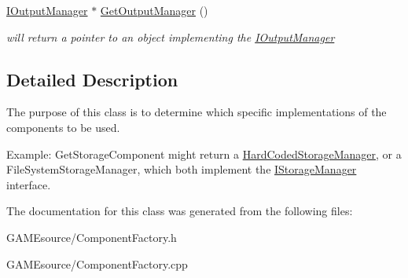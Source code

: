 \begin{DoxyCompactItemize}
\mbox{\label{class_component_factory_a19583d4fc53d5942e5c0558a52809086}} 
\mbox{\hyperlink{class_i_output_manager}{I\+Output\+Manager}} $\ast$ \mbox{\hyperlink{class_component_factory_a19583d4fc53d5942e5c0558a52809086}{Get\+Output\+Manager}} ()
\begin{DoxyCompactList}\small\item\em will return a pointer to an object implementing the \mbox{\hyperlink{class_i_output_manager}{I\+Output\+Manager}} \end{DoxyCompactList}\end{DoxyCompactItemize}


\subsection{Detailed Description}
The purpose of this class is to determine which specific implementations of the components to be used. 

Example\+: Get\+Storage\+Component might return a \mbox{\hyperlink{class_hard_coded_storage_manager}{Hard\+Coded\+Storage\+Manager}}, or a File\+System\+Storage\+Manager, which both implement the \mbox{\hyperlink{class_i_storage_manager}{I\+Storage\+Manager}} interface. 

The documentation for this class was generated from the following files\+:\begin{DoxyCompactItemize}
\item 
G\+A\+M\+Esource/Component\+Factory.\+h\item 
G\+A\+M\+Esource/Component\+Factory.\+cpp\end{DoxyCompactItemize}
